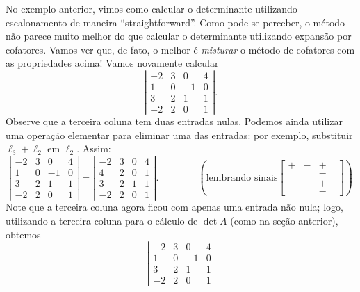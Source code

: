 \begin{obs}
No exemplo anterior, vimos como calcular o determinante utilizando escalonamento de maneira ``straightforward''. Como pode-se perceber, o método não parece muito melhor do que calcular o determinante utilizando expansão por cofatores. Vamos ver que, de fato, o melhor é \textit{misturar} o método de cofatores com as propriedades acima! Vamos novamente calcular
\begin{equation}
\left| \begin{matrix}
-2 & 3 & 0  & 4 \\
1  & 0 & -1 & 0 \\
3  & 2 & 1  & 1 \\
-2 & 2 & 0  & 1
\end{matrix}
\right|.
\end{equation} Observe que a terceira coluna tem duas entradas nulas. Podemos ainda utilizar uma operação elementar para eliminar uma das entradas: por exemplo, substituir $\ell_3 + \ell_2$ em $\ell_2$. Assim:
\begin{equation}
\left| \begin{matrix}
-2 & 3 & 0  & 4 \\
1  & 0 & -1 & 0 \\
3  & 2 & 1  & 1 \\
-2 & 2 & 0  & 1
\end{matrix}
\right| =
\left| \begin{matrix}
-2 & 3 & 0  & 4 \\
4  & 2 & 0  & 1 \\
3  & 2 & 1  & 1 \\
-2 & 2 & 0  & 1
\end{matrix}
\right|. \qquad  \qquad \left(  \text{lembrando sinais}
\begin{bmatrix}
+ & - & + &  \\
  &   & - &  \\
  &   & + &  \\
  &   & - &
\end{bmatrix}
\right)
\end{equation} Note que a terceira coluna agora ficou com apenas uma entrada não nula; logo, utilizando a terceira coluna para o cálculo de $\det A$ (como na seção anterior), obtemos
\begin{equation}
\left| \begin{matrix}
-2 & 3 & 0  & 4 \\
1  & 0 & -1 & 0 \\
3  & 2 & 1  & 1 \\
-2 & 2 & 0  & 1

\end{matrix}
\end{equation}
\end{obs}
